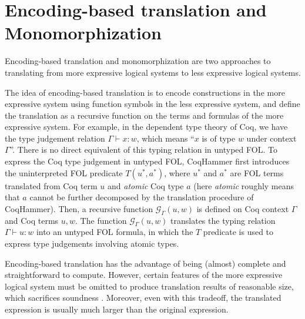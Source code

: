 \section{Encoding-based translation and Monomorphization}\label{subencmon}

  Encoding-based translation and monomorphization
  are two approaches to translating from more expressive logical systems to
  less expressive logical systems.

  The idea of encoding-based translation is to encode
  constructions in the more expressive system using function symbols in the less
  expressive system, and define the translation as a recursive function on the terms and formulas
  of the more expressive system. For example, in the dependent type theory of Coq,
  we have the type judgement relation $\Gamma \vdash x : w$, which means ``$x$ is of
  type $w$ under context $\Gamma$''. There is no direct equivalent of this
  typing relation in untyped FOL. To express the Coq type judgement in untyped FOL, 
  CoqHammer first introduces the uninterpreted FOL predicate $T(u^*, a^*)$, where
  $u^*$ and $a^*$ are FOL terms translated from Coq term $u$ and \textit{atomic} Coq type $a$
  (here \textit{atomic} roughly means that $a$ cannot be
  further decomposed by the translation procedure of CoqHammer). Then, a recursive function
  $\mathcal{G}_\Gamma(u, w)$ is defined on Coq context $\Gamma$ and Coq terms $u, w$.
  The function $\mathcal{G}_\Gamma(u, w)$ translates the typing relation $\Gamma \vdash u : w$ into an untyped FOL formula,
  in which the $T$ predicate is used to express type judgements involving atomic types.
  
  Encoding-based translation has the advantage of being (almost) complete
  and straightforward to compute. However, certain features of the more expressive
  logical system must be omitted to produce translation results of reasonable size,
  which sacrifices soundness \cite{Czajka2018HammerFC}. Moreover, even with this tradeoff,
  the translated expression is usually much larger than the original expression.

